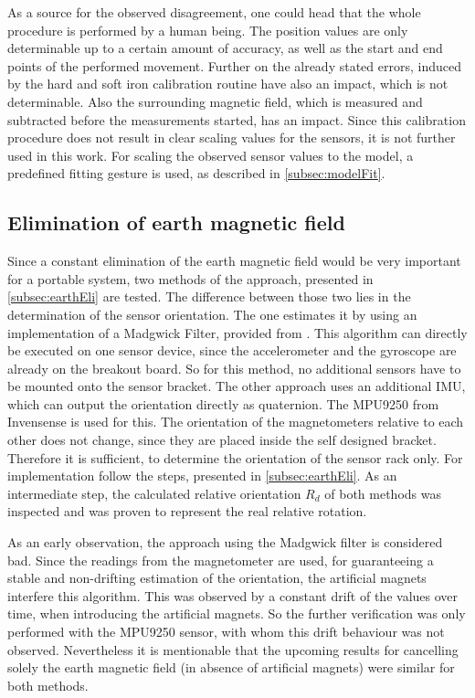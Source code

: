 As a source for the observed disagreement, one could head that the whole procedure is performed by a human being. The position values are only determinable up to a certain amount of accuracy, as well as the start and end points of the performed movement. Further on the already stated errors, induced by the hard and soft iron calibration routine have also an impact, which is not determinable. Also the surrounding magnetic field, which is measured and subtracted before the measurements started, has an impact. Since this calibration procedure does not result in clear scaling values for the sensors, it is not further used in this work. For scaling the observed sensor values to the model, a predefined fitting gesture is used, as described in \ref{subsec:modelFit}.  


\subsection{Elimination of earth magnetic field} \label{subsec:resEarthEli}

Since a constant elimination of the earth magnetic field would be very important for a portable system, two methods of the approach, presented in \ref{subsec:earthEli} are tested. The difference between those two lies in the determination of the sensor orientation. The one estimates it by using an implementation of a Madgwick Filter, provided from \cite{mikeshub2012}. This algorithm can directly be executed on one sensor device, since the accelerometer and the gyroscope are already on the breakout board. So for this method, no additional sensors have to be mounted onto the sensor bracket. The other approach uses an additional \ac{IMU}, which can output the orientation directly as quaternion. The MPU9250 from Invensense \cite{MPU2014} is used for this. The orientation of the magnetometers relative to each other does not change, since they are placed inside the self designed bracket. Therefore it is sufficient, to determine the orientation of the sensor rack only. For implementation follow the steps, presented in \ref{subsec:earthEli}. As an intermediate step, the calculated relative orientation $ R_{d} $ of both methods was inspected and was proven to represent the real relative rotation.

As an early observation, the approach using the Madgwick filter is considered bad. Since the readings from the magnetometer are used, for guaranteeing a stable and non-drifting estimation of the orientation, the artificial magnets interfere this algorithm. This was observed by a constant drift of the values over time, when introducing the artificial magnets. So the further verification was only performed with the MPU9250 sensor, with whom this drift behaviour was not observed. Nevertheless it is mentionable that the upcoming results for cancelling solely the earth magnetic field (in absence of artificial magnets) were similar for both methods.

